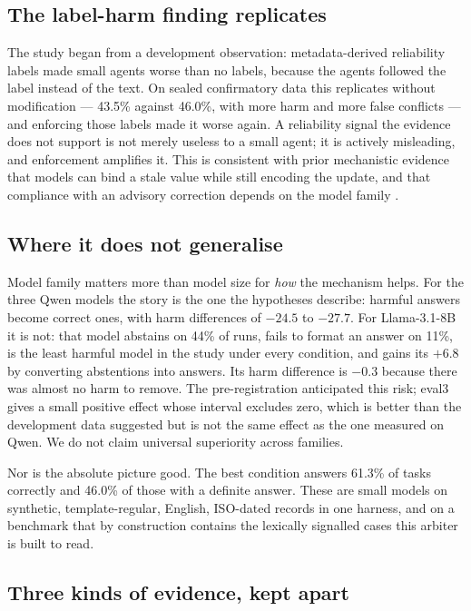 \subsection{The label-harm finding replicates}

The study began from a development observation: metadata-derived reliability labels made small agents worse than
no labels, because the agents followed the label instead of the text. On sealed confirmatory data this replicates
without modification ---  43.5\% against  46.0\%, with more harm and more false conflicts --- and
enforcing those labels made it worse again. A reliability signal the evidence does not support is not merely
useless to a small agent; it is actively misleading, and enforcement amplifies it. This is consistent with prior
mechanistic evidence that models can bind a stale value while still encoding the update, and that compliance with
an advisory correction depends on the model family \citep{guo2026cicm}.

\subsection{Where it does not generalise}

Model family matters more than model size for \emph{how} the mechanism helps. For the three Qwen models the story
is the one the hypotheses describe: harmful answers become correct ones, with harm differences of $-24.5$ to
$-27.7$\pp. For Llama-3.1-8B it is not: that model abstains on 44\% of  runs, fails to format an answer
on 11\%, is the least harmful model in the study under every condition, and gains its $+6.8$\pp{} by converting
abstentions into answers. Its harm difference is $-0.3$\pp{} because there was almost no harm to remove. The
pre-registration anticipated this risk; eval3 gives a small positive effect whose interval excludes zero, which is
better than the development data suggested but is not the same effect as the one measured on Qwen. We do not claim
universal superiority across families.

Nor is the absolute picture good. The best condition answers 61.3\% of tasks correctly and 46.0\% of those with a
definite answer. These are small models on synthetic, template-regular, English, ISO-dated records in one harness,
and on a benchmark that by construction contains the lexically signalled cases this arbiter is built to read.

\subsection{Three kinds of evidence, kept apart}

